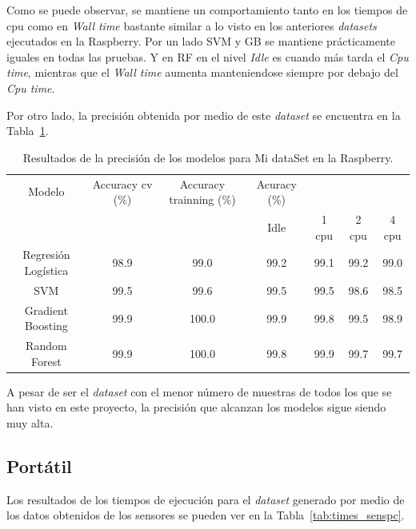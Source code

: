 \documentclass[a4paper, 12pt]{book}
\begin{document}
Como se puede observar, se mantiene un comportamiento tanto en los tiempos de cpu como en \textit{Wall time} bastante similar a lo visto en los anteriores \textit{datasets} ejecutados en la Raspberry. Por un lado SVM y GB se mantiene prácticamente iguales en todas las pruebas. Y en RF en el nivel \textit{Idle} es cuando más tarda el \textit{Cpu time}, mientras que el \textit{Wall time} aumenta manteniendose siempre por debajo del \textit{Cpu time}.

Por otro lado, la precisión obtenida por medio de este \textit{dataset} se encuentra en la Tabla~\ref{tab:acc_sensrasp}.

\begin{table}[]
\begin{adjustbox}{width=\textwidth}
\centering
    \begin{tabular}{c  c  c  c  c  c  c}
    \hline
    Modelo & Accuracy cv (\%) & Accuracy trainning (\%) & Acuracy (\%) & & & \\
    \cline{4-7}
     &  &   &  Idle & 1 cpu & 2 cpu & 4 cpu \\
     \hline
     Regresión Logística & 98.9 & 99.0 & 99.2 & 99.1 & 99.2 & 99.0\\
     SVM & 99.5 & 99.6 & 99.5 & 99.5 & 98.6 & 98.5\\
     Gradient Boosting & 99.9 & 100.0 & 99.9 & 99.8 & 99.5 & 98.9\\
     Random Forest & 99.9 & 100.0 & 99.8 & 99.9 & 99.7 & 99.7\\
    \hline
    \end{tabular}
\end{adjustbox}
\caption{Resultados de la precisión de los modelos para Mi dataSet en la Raspberry.}
\label{tab:acc_sensrasp}
\end{table}

A pesar de ser el \textit{dataset} con el menor número de muestras de todos los que se han visto en este proyecto, la precisión que alcanzan los modelos sigue siendo muy alta.

\subsection{Portátil}
\label{subsec:pc_sensados}

Los resultados de los tiempos de ejecución para el \textit{dataset} generado por medio de los datos obtenidos de los sensores se pueden ver en la Tabla~\ref{tab:times_senspc}.
\end{document}
